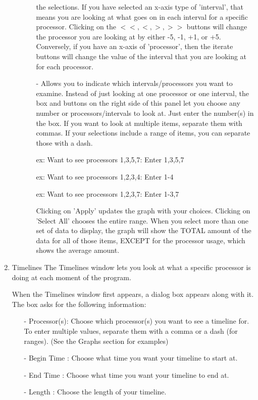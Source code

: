 \begin{enumerate}
\begin{enumerate}
\begin{itemize}
        the selections.  If you have selected an x-axis type of 'interval',
        that means you are looking at what goes on in each interval for a
        specific processor.  Clicking on the $<<, <, >, >>$ buttons will change
        the processor you are looking at by either -5, -1, +1, or +5.
        Conversely, if you have an x-axis of 'processor', then the iterate
        buttons will change the value of the interval that you are looking at
        for each processor.
      \item[-]
        Allows you to indicate which intervals/processors you want to examine.
        Instead of just looking at one processor or one interval, the box and
        buttons on the right side of this panel let you choose any number or
        processors/intervals to look at.  Just enter the number(s) in the box.
        If you want to look at multiple items, separate them with commas.  If
        your selections include a range of items, you can separate those with
        a dash.

        ex: Want to see processors 1,3,5,7:  Enter 1,3,5,7

	ex: Want to see processors 1,2,3,4:  Enter 1-4

	ex: Want to see processors 1,2,3,7:  Enter 1-3,7

        Clicking on 'Apply' updates the graph with your choices.
        Clicking on 'Select All' chooses the entire range.  When you select more
        than one set of data to display, the graph will show the TOTAL amount of
        the data for all of those items, EXCEPT for the processor usage, which
        shows the average amount.
      \end{itemize}
    \end{enumerate}

\item
Timelines
   The Timelines window lets you look at what a specific processor is doing at
   each moment of the program.

   When the Timelines window first appears, a dialog box appears along with it.
   The box asks for the following information:
   \begin{itemize}
   \item[-]
     Processor(s):  Choose which processor(s) you want to see a timeline for.
                    To enter multiple values, separate them with a comma or a
                    dash (for ranges).  (See the Graphs section for examples)
   \item[-]
     Begin Time  : Choose what time you want your timeline to start at.
   \item[-]
     End Time    : Choose what time you want your timeline to end at.
   \item[-]
     Length      : Choose the length of your timeline.
   \end{itemize}


\end{enumerate}
